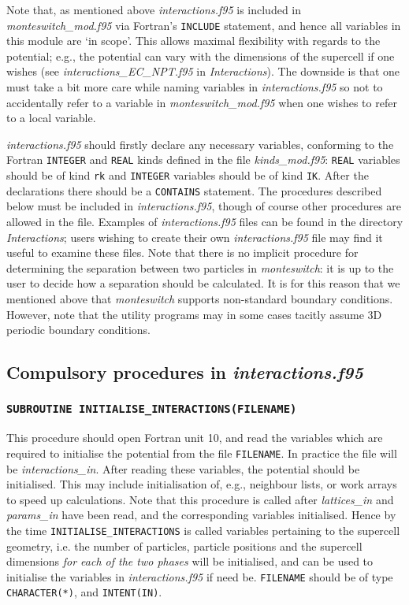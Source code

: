 \documentclass{report}
\begin{document}
Note that, as mentioned above \emph{interactions.f95} is included in \emph{monteswitch\_mod.f95} via Fortran's \verb|INCLUDE| statement, and hence
all variables in this module are `in scope'. This allows maximal flexibility with regards to the potential; e.g., the potential can vary
with the dimensions of the supercell if one wishes (see \emph{interactions\_EC\_NPT.f95} in \emph{Interactions}). The downside is that one
must take a bit more care while naming variables in \emph{interactions.f95} so not to accidentally refer to a variable in 
\emph{monteswitch\_mod.f95} when one wishes to refer to a local variable. 

\emph{interactions.f95} should firstly declare any necessary variables, conforming to the Fortran \verb|INTEGER| and \verb|REAL| kinds defined
in the file \emph{kinds\_mod.f95}: \verb|REAL| variables should be of kind \verb|rk| and \verb|INTEGER| variables should be of kind \verb|IK|.
After the declarations there should be a \verb|CONTAINS| statement.
The procedures described below must be included in \emph{interactions.f95}, though of course other procedures are allowed in the file.
Examples of \emph{interactions.f95} files can be found in the directory \emph{Interactions}; users wishing to create their own
\emph{interactions.f95} file may find it useful to examine these files. 
Note that there is no implicit procedure for determining the separation between two particles in \emph{monteswitch}: it is up to the
user to decide how a separation should be calculated. It is for this reason that we mentioned above that \emph{monteswitch} supports non-standard
boundary conditions. However, note that the utility programs may in some cases tacitly assume 3D periodic boundary conditions. 

\subsection{Compulsory procedures in \emph{interactions.f95}}

\subsubsection{\texttt{SUBROUTINE INITIALISE\_INTERACTIONS(FILENAME)}}
This procedure should open Fortran unit 10, and read 
the variables which are required to initialise the potential from the file \verb|FILENAME|.
In practice the file will be \emph{interactions\_in}. After reading these variables, the potential should be initialised. This may include
initialisation of, e.g., neighbour lists, or work arrays to speed up calculations. Note that this procedure is called after \emph{lattices\_in}
and \emph{params\_in} have been read, and the corresponding variables initialised. Hence by the time \verb|INITIALISE_INTERACTIONS| is called 
variables pertaining to the supercell geometry, i.e. the number of particles, particle positions and the supercell dimensions 
\emph{for each of the two phases} will be initialised, and can be used to initialise the variables in \emph{interactions.f95} if need be.
\verb|FILENAME| should be of type \verb|CHARACTER(*)|, and \verb|INTENT(IN)|.
\end{document}
